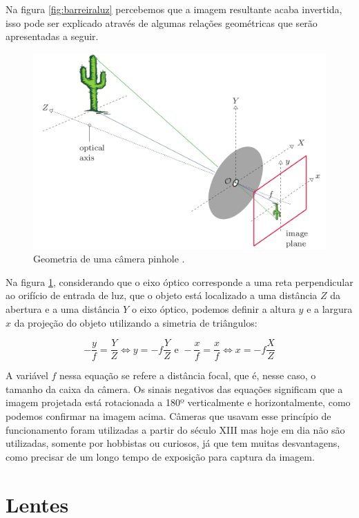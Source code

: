 \documentclass[
  brazilian,
]{book}
\begin{document}
Na figura \ref{fig:barreiraluz} percebemos que a imagem resultante acaba invertida, isso pode ser explicado através de algumas relações geométricas que serão apresentadas a seguir.



\begin{figure}

{\centering \includegraphics[width=0.55\linewidth]{imagens/02-formacao/geometriapinhole} 

}

\caption{Geometria de uma câmera pinhole \autocite[p.5]{burger2009}.}\label{fig:geometriapinhole}
\end{figure}

Na figura \ref{fig:geometriapinhole}, considerando que o eixo óptico corresponde a uma reta perpendicular ao orifício de entrada de luz, que o objeto está localizado a uma distância \(Z\) da abertura e a uma distância \(Y\) o eixo óptico, podemos definir a altura \(y\) e a largura \(x\) da projeção do objeto utilizando a simetria de triângulos:

\[-\frac{y}{f}=\frac{Y}{Z}\Leftrightarrow y=-f\frac{Y}{Z} \text{ e } -\frac{x}{f}=\frac{x}{f} \Leftrightarrow x=-f\frac{X}{Z}\]

A variável \(f\) nessa equação se refere a distância focal, que é, nesse caso, o tamanho da caixa da câmera. Os sinais negativos das equações significam que a imagem projetada está rotacionada a 180º verticalmente e horizontalmente, como podemos confirmar na imagem acima. Câmeras que usavam esse princípio de funcionamento foram utilizadas a partir do século XIII mas hoje em dia não são utilizadas, somente por hobbistas ou curiosos, já que tem muitas desvantagens, como precisar de um longo tempo de exposição para captura da imagem.

\hypertarget{lentes}{%
\section{Lentes}\label{lentes}}
\end{document}
